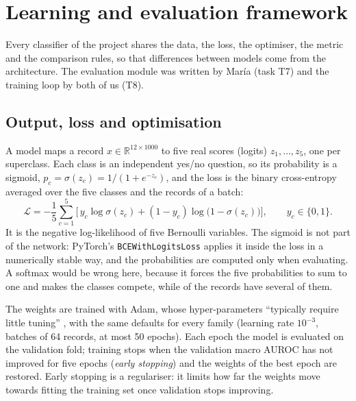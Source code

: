 \section{Learning and evaluation framework}\label{sec:framework}

Every classifier of the project shares the data, the loss, the optimiser, the metric and the
comparison rules, so that differences between models come from the architecture. The evaluation
module was written by Mar\'ia (task T7) and the training loop by both of us (T8).

\subsection{Output, loss and optimisation}

A model maps a record $x \in \mathbb{R}^{12\times1000}$ to five real scores (logits) $z_1,\dots,z_5$,
one per superclass. Each class is an independent yes/no question, so its probability is a sigmoid,
$p_c = \sigma(z_c) = 1/(1+e^{-z_c})$, and the loss is the binary cross-entropy averaged over the five
classes and the records of a batch:
\begin{equation}
\mathcal{L} = -\frac{1}{5}\sum_{c=1}^{5}\Big[\,y_c \log \sigma(z_c) + (1-y_c)\log\big(1-\sigma(z_c)\big)\Big],
\qquad y_c \in \{0,1\}.
\end{equation}
It is the negative log-likelihood of five Bernoulli variables. The sigmoid is not part of the network:
PyTorch's \texttt{BCEWithLogitsLoss} applies it inside the loss in a numerically stable way, and the
probabilities are computed only when evaluating. A softmax would be wrong here, because it forces the
five probabilities to sum to one and makes the classes compete, while
\edaFracMultilabelAllPct{} of the records have several of them.

The weights are trained with Adam, whose hyper-parameters ``typically require little tuning''
\cite[p.~1]{kingma2015adam}, with the same defaults for every family (learning rate $10^{-3}$,
batches of 64 records, at most 50 epochs). Each epoch the model is evaluated on the validation fold;
training stops when the validation macro AUROC has not improved for five epochs (\emph{early
stopping}) and the weights of the best epoch are restored. Early stopping is a regulariser: it limits
how far the weights move towards fitting the training set once validation stops improving.

